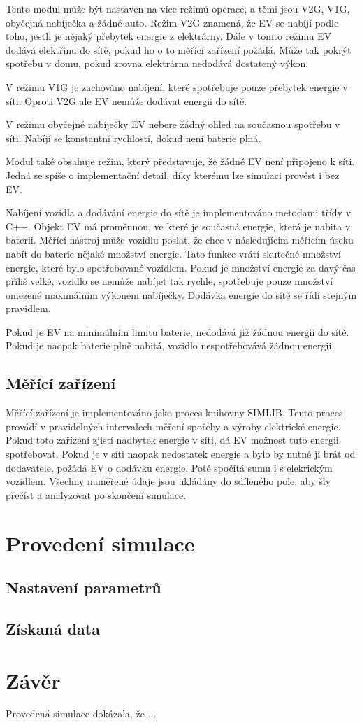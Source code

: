 \documentclass[12pt,a4paper]{article}
\begin{document}
Tento modul může být nastaven na více režimů operace, a těmi jsou V2G, V1G, obyčejná nabíječka a žádné auto.
Režim V2G znamená, že EV se nabíjí podle toho, jestli je nějaký přebytek energie z elektrárny.
Dále v tomto režimu EV dodává elektřinu do sítě, pokud ho o to měřící zařízení požádá.
Může tak pokrýt spotřebu v domu, pokud zrovna elektrárna nedodává dostatený výkon.

V režimu V1G je zachováno nabíjení, které spotřebuje pouze přebytek energie v síti.
Oproti V2G ale EV nemůže dodávat energii do sítě.

V režimu obyčejné nabíječky EV nebere žádný ohled na současnou spotřebu v síti.
Nabíjí se konstantní rychlostí, dokud není baterie plná.

Modul také obsahuje režim, který představuje, že žádné EV není připojeno k síti.
Jedná se spíše o implementační detail, díky kterému lze simulaci provést i bez EV.

Nabíjení vozidla a dodávání energie do sítě je implementováno metodami třídy v C++.
Objekt EV má proměnnou, ve které je současná energie, která je nabita v baterii.
Měřící nástroj může vozidlu poslat, že chce v následujícím měřícím úseku nabít do baterie nějaké množství energie.
Tato funkce vrátí skutečné množství energie, které bylo spotřebované vozidlem.
Pokud je množství energie za davý čas příliš velké,
vozidlo se nemůže nabíjet tak rychle, spotřebuje pouze množství omezené maximálním výkonem nabíječky.
Dodávka energie do sítě se řídí stejným pravidlem.

Pokud je EV na minimálním limitu baterie, nedodává již žádnou energii do sítě.
Pokud je naopak baterie plně nabitá, vozidlo nespotřebovává žádnou energii.

\subsection{Měřící zařízení}
Měřící zařízení je implementováno jeko proces knihovny SIMLIB.
Tento proces provádí v pravidelných intervalech měření spořeby a výroby elektrické energie.
Pokud toto zařízení zjistí nadbytek energie v síti, dá EV možnost tuto energii spotřebovat.
Pokud je v síti naopak nedostatek energie a bylo by nutné ji brát od dodavatele, požádá EV o dodávku energie.
Poté spočítá sumu i s elekrickým vozidlem.
Všechny naměřené údaje jsou ukládány do sdíleného pole, aby šly přečíst a analyzovat po skončení simulace.

\section{Provedení simulace}

\subsection{Nastavení parametrů}

\subsection{Získaná data}


\section{Závěr}

Provedená simulace dokázala, že ...

\printbibliography
\end{document}

